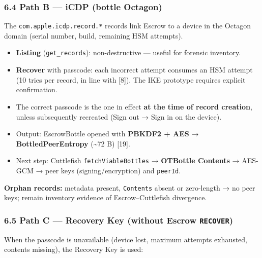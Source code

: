 \documentclass[
  english,
  10pt]{article}
\providecommand{\tightlist}{%
  \setlength{\itemsep}{0pt}\setlength{\parskip}{0pt}}
\begin{document}
\subsubsection{6.4 Path B --- iCDP (bottle
Octagon)}\label{path-b-icdp-bottle-octagon}

The \texttt{com.apple.icdp.record.*} records link Escrow to a device in
the Octagon domain (serial number, build, remaining HSM attempts).

\begin{itemize}
\tightlist
\item
  \textbf{Listing} (\texttt{get\_records}): non-destructive --- useful
  for forensic inventory.
\item
  \textbf{Recover} with passcode: each incorrect attempt consumes an HSM
  attempt (10 tries per record, in line with {[}8{]}). The IKE prototype
  requires explicit confirmation.
\item
  The correct passcode is the one in effect \textbf{at the time of
  record creation}, unless subsequently recreated (Sign out → Sign in on
  the device).
\item
  Output: EscrowBottle opened with \textbf{PBKDF2 + AES} →
  \textbf{BottledPeerEntropy} (\textasciitilde72 B) {[}19{]}.
\item
  Next step: Cuttlefish \texttt{fetchViableBottles} → \textbf{OTBottle
  Contents} → AES-GCM → peer keys (signing/encryption) and
  \texttt{peerId}.
\end{itemize}

\textbf{Orphan records:} metadata present, \texttt{Contents} absent or
zero-length → no peer keys; remain inventory evidence of
Escrow--Cuttlefish divergence.

\subsubsection{\texorpdfstring{6.5 Path C --- Recovery Key (without
Escrow
\texttt{RECOVER})}{6.5 Path C --- Recovery Key (without Escrow RECOVER)}}\label{path-c-recovery-key-without-escrow-recover}

When the passcode is unavailable (device lost, maximum attempts
exhausted, contents missing), the Recovery Key is used:
\end{document}
